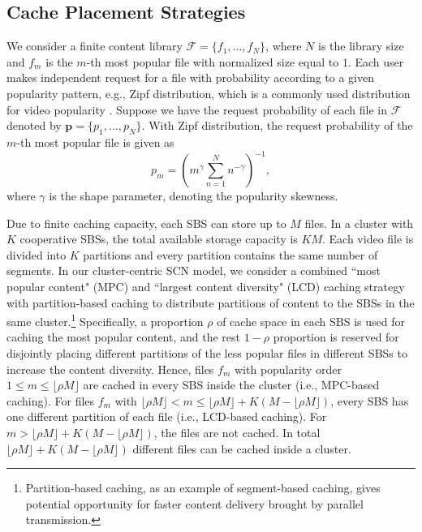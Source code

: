 \documentclass[twocolumns,10pt]{IEEEtran}
\begin{document}
\subsection{Cache Placement Strategies}
We consider a finite content library $\mathcal{F}=\{f_1, \ldots, f_N\}$, where $N$ is the library size and $f_m$ is the $m$-th most popular file with normalized size equal to $1$. Each user makes independent request for a file with probability according to a given popularity pattern, e.g., Zipf distribution, which is a commonly used distribution for video popularity \cite{zipf}. Suppose we have the request probability of each file in $\mathcal{F}$ denoted by $\mathbf{p}=\{p_1, \ldots, p_N\}$.
With Zipf distribution, the request probability of the $m$-th most popular file is given as
\begin{equation}
p_m=\left(m^{\gamma} \sum\limits_{n=1}^{N}n^{-\gamma}\right)^{-1}, 
\label{zipf_probability}
\end{equation}
where $\gamma$ is the shape parameter, denoting the popularity skewness. 

Due to finite caching capacity, each SBS can store up to $M$ files. In a cluster with $K$ cooperative SBSs, the total available storage capacity is $KM$. Each video file is divided into $K$ partitions and every partition contains the same number of segments. In our cluster-centric SCN model, we consider a combined ``most popular content" (MPC) and ``largest content diversity" (LCD) caching strategy with partition-based caching \cite{partition_based} to distribute partitions of content to the SBSs in the same cluster.\footnote{Partition-based caching, as an example of segment-based caching, gives potential opportunity for faster content delivery brought by parallel transmission.}
Specifically, a proportion $\rho$ of cache space in each SBS is used for caching the most popular content, and the rest $1-\rho$ proportion is reserved for disjointly placing different partitions of the less popular files in different SBSs to increase the content diversity. Hence, files $f_m$ with popularity order $1\leq m\leq \lfloor\rho M \rfloor $ are cached in every SBS inside the cluster (i.e., MPC-based caching). For files $f_m$ with $\lfloor\rho M \rfloor < m\leq \lfloor \rho M\rfloor+K(M-\lfloor \rho M\rfloor) $, every SBS has one different partition of each file (i.e., LCD-based caching). For $m>\lfloor \rho M\rfloor+K(M-\lfloor \rho M\rfloor)$, the files are not cached. In total $\lfloor \rho M\rfloor+K(M-\lfloor \rho M\rfloor)$ different files can be cached inside a cluster. 
\end{document}
